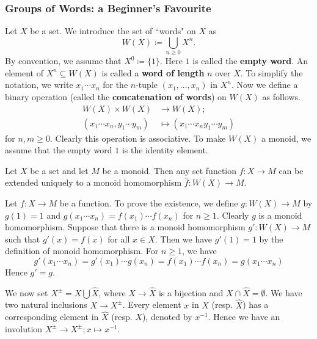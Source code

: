 \subsubsection{Groups of Words: a Beginner's Favourite}
Let $X$ be a set. We introduce the set of ``words" on $X$ as
\begin{equation*}
	W(X) \coloneq \bigcup_{n\geq 0} X^n.
\end{equation*}
By convention, we assume that $X^0 \coloneq \{1\}$. Here $1$ is called the \textbf{empty word}.
An element of $X^n\subseteq W(X)$ is called a \textbf{word of length} $n$ over $X$.  To simplify the notation, we write $x_1\cdots x_n$ for the $n$-tuple $(x_1,\dots, x_n)$ in $X^n$. Now we define a binary operation (called the \textbf{concatenation of words}) on $W(X)$ as follows.
\begin{align*}
	W(X)\times W(X)&\to W(X);
	\\
	(x_1\cdots x_n,y_1\cdots y_m) &\mapsto (x_1\cdots x_ny_1\cdots y_m)
\end{align*}
for $n,m\geq 0$. Clearly this operation is associative. To make $W(X)$ a monoid, we assume that the empty word $1$ is the identity element.
\begin{proposition} \label{prop-set-func-to-monoid-homo}
	Let $X$ be a set and let $M$ be a monoid. Then any set function $f:X\to M$ can be extended uniquely to a monoid homomorphism $\hat{f}:W(X)\to M$.
\end{proposition}
\begin{sketch}
	Let $f:X\to M$ be a function. To prove the existence, we define $g:W(X) \to M$ by $g(1) = 1$ and $g(x_1\cdots x_n) = f(x_1)\cdots f(x_n)$ for $n\geq 1$. Clearly $g$ is a monoid homomorphism. Suppose that there is a monoid homomorphism $g':W(X)\to M$ such that $g'(x) = f(x)$ for all $x\in X$. Then we have $g'(1)=1$ by the definition of monoid homomorphism. For $n\geq 1$, we have
	\begin{equation*}
		g'(x_1 \cdots x_n) = g'(x_1) \cdots g(x_n) = f(x_1) \cdots f(x_n) =g(x_1\cdots x_n)
	\end{equation*}
	Hence $g' = g$.
\end{sketch}
We now set $X^{\pm} = X \bigcup \hat{X}$, where $X\to \hat{X}$ is a bijection and $X\cap \hat{X} = \emptyset$. We have two natural inclusions $X\to X^{\pm}$. Every element $x$ in $X$ (resp. $\hat{X}$) has a corresponding element in $\hat{X}$ (resp. $X$), denoted by $x^{-1}$. Hence we have an involution $X^{\pm}\to X^{\pm}; x\mapsto x^{-1}$.

